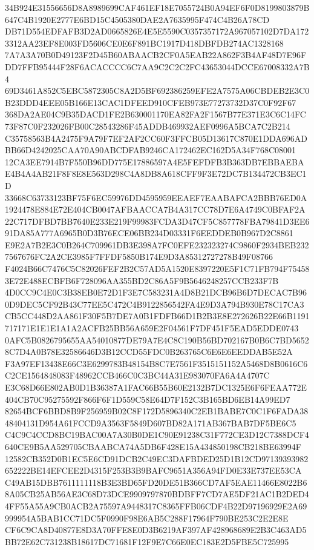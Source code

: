 \documentclass[UTF8,fontset=fandol,zihao=-4,a4paper]{ctexart}
\begin{document}
{{34B924E31556656D8A8989699CAF461EF18E7055724B0A94EF6F0D8199803879B647C4B1920E2777E6BD15C4505380DAE2A7635995F474C4B26A78CD
DB71D554EDFAFB3D2AD0665826E4E5E5590C0357357172A967057102D7DA1723312AA23EF8E003FD5606CE0E6F891BC1917D418DBFDB274AC1328168
7A7A3A70B0D49123F2D45B60ABAACB2CF0A5EAB22A862F3B4AF48D7E96FDD7FFB95444F28F6ACACCCC6C7AA9C2C2C2FC43653044DCCE67008332A7B4
69D3461A852C5EBC5872305C8A2D5BF692386259EFE2A7575A06CBDEB2E3C0B23DDD4EEE05B166E13CAC1DFEED910CFEB973E77273732D37C0F92F67
368DA2AE04C9B35DACD1FE2B630001170EA82FA2F1567B77E371E3C6C14FC73F87C0F232026FB00C28543286F45ADDB469932AEF0996A5BCA7C2B214
C35758563B4A2475F9A79F7EF2AF2CC60F3FFCB05D13617C870E1DDA696ADBB66D4242025CAA70A90ABCDFAB9246CA172462EC162D5A34F768C08001
12CA3EE7914B7F550B96DD775E17886597A4E5FEFDFB3B363DB7EBBAEBAE4B4A4AB21F8F8E8E563D298C4A8DB8A618CFF9F3E72DC7B134472CB3EC1D
33668C63733123BF75F6EC59976DD4595959EEAEF7EAABAFCA2BBB76ED0A1924478E884E72E404CB0047AFBAACCA7B4A317CC78D7E6A4749C0BFAF2A
22C717DFBD7BB7640E233E219F99983FCDA3D47CF5C857778FBA79841D3EE691DA85A777A6965B0D3B76ECE06BB234D03331F6EEDDEB0B967D2C8861
E9E2A7B2E3C0B264C709961DB3E398A7FC0EFE232323274C9860F2934BEB2327567676FC2A2CE3985F7FFDF5850B174E9D3A85312727278B49F08766
F4024B66C7476C5C82026FEF2B2C57AD5A1520E8397220E5F1C71FB794F754583E72E488ECBFB6F728096AA355BD2C86A5F9B5646248257CCB233F7B
4D0CC9C4E0C3B38EB0E72D1F3E7C583231A4D8B21DCB96B6D7DECAC7B960D9DEC5CF92B43C77EE5C472C4B9122856542FA4E9D3A794B930E78C17CA3
CB5CC448D2AA861F30F5B7DE7A0B1FDFB66D1B2B3E8E272626B22E66B1191717171E1E1E1A1A2ACFB25BB56A659E2F04561F7DF451F5EAD5EDDE0743
0AFC5B0826795655AA54010877DE79A7E4C8C190B56BD702167B0B6C7BD56528C7D4A0B78E32586646D3B12CCD55FDC0B263765C6E6E6EEDDAB5E52A
F3A97EF13438E66C3E6299783B48154B8C7E7561F3515151152A5468D8B0616C6C2CE1564848083F48962CCB466C0C3BC44A31E983070FA6A4A4707C
E3C68D66E802AB0D1B36387A1FAC66B55B60E2132B7DC1325E6F6FEAA772E404CB70C95275592F866F6F1D559C58E64D7F152C3B165BD6EB14A99ED7
82654BCF6BBD8B9F256959B02C8F172D5896340C2EB1BABE7C0C1F6FADA3848404131D954A61FCCD9A3563F5849D607BD82A171AB367BAB7DF5BE6C5
C4C9C4CCD8BC19BAC00A7A30B0DE1C90E91238C31F772CE3D12C7388DCF4640CE9B5AA529705CBAABCA74A5DB6F428E15A434850198CB218BE63994F
12582CB352D0B1EC5E6CD91DCB2C49EC3DAFBDED25D1B12CD97139393982652222BE14EFCEE2D4315F253B3B9BAFC9651A356A94FD0E33E737EE53CA
C49AB15DBB7611111118B3E3BD65FD20DE51B366CD7AF5EAE11466E8022B68A05CB25AB56AE3C68D73DCE9909797870BDBFF7CD7AE5DF21AC1B2DED4
4FF55A55A9CB0ACB2A75597A9448317C8365FFB06CDF4B22D97196929E2A69999954A5BAB1CC71DC5F0990F98E6AB5C288F17964F790BE253C2E2E8E
CF6C9CA8D40877E8D3A70FFE8E0D3B6219AF397AF428968689E2B3C463AD5BB72E62C731238B18617DC71681F12F9E7C66E0EC183E2D5FBE5C725995
}}
\end{document}
